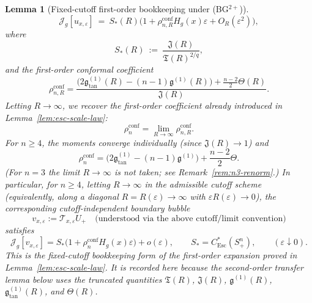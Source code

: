 \documentclass[11pt,reqno,a4paper]{amsart}
\numberwithin{equation}{section}
\theoremstyle{plain}
\newtheorem{lemma}[theorem]{Lemma}
\theoremstyle{remark}
\theoremstyle{plain}
\begin{document}
\begin{lemma}[Fixed-cutoff first-order bookkeeping under \textup{(BG$^{2+}$)}]
\begin{equation}
\mathcal J_g[u_{x,\varepsilon}]
\ =\ S_\ast(R)\Big(1+\rho_{n,R}^{\mathrm{conf}}H_g(x)\varepsilon + O_R(\varepsilon^2)\Big),
\end{equation}
where
\begin{equation}\label{eq:Sstar-R}
S_\ast(R)\ :=\ \frac{\mathfrak{J}(R)}{\mathfrak{T}(R)^{2/q}},
\end{equation}
and the \emph{first-order conformal coefficient}
\begin{equation}\label{eq:rho-conf-R}
\rho_{n,R}^{\mathrm{conf}}
=
\frac{\Big(2\mathfrak g^{(1)}_{\mathrm{tan}}(R)-(n-1)\mathfrak g^{(1)}(R)\Big)
+\tfrac{n-2}{2}\Theta(R)}
{\mathfrak{J}(R)}.
\end{equation}
Letting $R\to\infty$, we recover the first-order coefficient already
introduced in Lemma~\ref{lem:esc-scale-law}:
\[
\rho_n^{\mathrm{conf}}
=
\lim_{R\to\infty}\rho_{n,R}^{\mathrm{conf}}.
\]
For $n\ge 4$, the moments converge individually (since $\mathfrak{J}(R)\to 1$) and
\begin{equation}\label{eq:rho-conf-final-restated}
\rho_n^{\mathrm{conf}} = \Big(2\mathfrak g^{(1)}_{\mathrm{tan}}-(n-1)\mathfrak g^{(1)}\Big)
+\frac{n-2}{2}\Theta.
\end{equation}
(For $n=3$ the limit $R\to\infty$ is not taken; see Remark~\ref{rem:n3-renorm}.) In particular, for $n\ge4$, letting $R\to\infty$ in the admissible cutoff scheme
(equivalently, along a diagonal $R=R(\varepsilon)\to\infty$ with $\varepsilon R(\varepsilon)\to0$),
the corresponding cutoff-independent boundary bubble
\[
v_{x,\varepsilon}:=\mathcal T_{x,\varepsilon}U_+
\quad\text{(understood via the above cutoff/limit convention)}
\]
satisfies
\[
\mathcal J_g[v_{x,\varepsilon}]
= S_\ast\big(1+\rho_n^{\mathrm{conf}}H_g(x)\varepsilon\big)+o(\varepsilon),
\qquad
S_\ast=C^*_{\mathrm{Esc}}(S^n_+),
\qquad (\varepsilon\downarrow0).
\]
This is the fixed-cutoff bookkeeping form of the first-order expansion proved
in Lemma~\ref{lem:esc-scale-law}.  It is recorded here because the
second-order transfer lemma below uses the truncated quantities
$\mathfrak T(R)$, $\mathfrak J(R)$, $\mathfrak g^{(1)}(R)$,
$\mathfrak g^{(1)}_{\tan}(R)$, and $\Theta(R)$.
\end{lemma}
\end{document}
